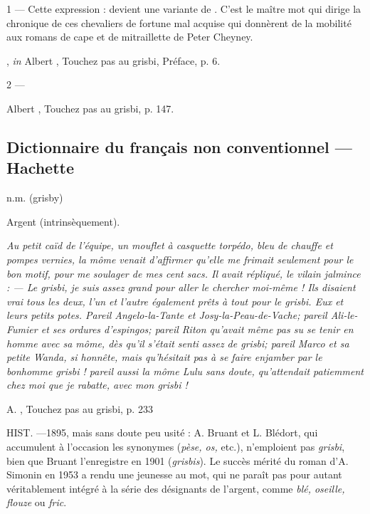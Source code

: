 1 --- Cette expression :  devient une variante de . C'est le maître mot qui dirige la chronique de ces chevaliers de fortune mal acquise qui donnèrent de la mobilité aux romans de cape et de mitraillette de Peter Cheyney.

			, \emph{in} Albert , Touchez pas au grisbi, Préface, p. 6.

2 --- 

			Albert , Touchez pas au grisbi, p. 147.


\subsection*{Dictionnaire du français non conventionnel --- Hachette}

n.m. (grisby)

Argent (intrinsèquement).

\emph{Au petit caïd de l'équipe, un mouflet à casquette torpédo, bleu de
chauffe et pompes vernies, la môme venait d'affirmer qu'elle me frimait
seulement pour le bon motif, pour me soulager de mes cent sacs. Il avait
répliqué, le vilain jalmince :
--- Le \emph{grisbi}, je suis assez grand pour aller le chercher moi-même !
Ils disaient vrai tous les deux, l'un et l'autre également prêts à tout pour le
\emph{grisbi}. Eux et leurs petits potes. Pareil Angelo-la-Tante et
Josy-la-Peau-de-Vache; pareil Ali-le-Fumier et ses ordures d'espingos;
pareil Riton qu'avait même pas su se tenir en homme avec sa môme, dès qu'il
s'était senti assez de \emph{grisbi}; pareil Marco et sa petite Wanda, si
honnête, mais qu'hésitait pas à se faire enjamber par le bonhomme \emph{grisbi} ! pareil aussi la môme Lulu sans doute, qu'attendait patiemment chez moi que je rabatte, avec mon \emph{grisbi} !}

			A. , Touchez pas au grisbi, p. 233

HIST. ---1895, mais sans doute peu usité : A. Bruant et L. Blédort, qui
accumulent à l'occasion les synonymes (\emph{pèse, os,} etc.), n'emploient pas \emph{grisbi}, bien que Bruant l'enregistre en 1901 (\emph{grisbis}). Le succès mérité du roman d'A. Simonin en 1953 a rendu une jeunesse au mot, qui ne paraît pas pour autant véritablement intégré à la série des désignants de l'argent, comme \emph{blé, oseille, flouze} ou \emph{fric}.

